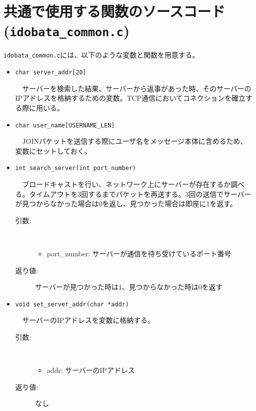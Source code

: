\documentclass[uplatex,dvipdfmx,11pt,a4paper]{jsarticle} %
\begin{document}
\section{共通で使用する関数のソースコード({\tt idobata\_common.c})}
{\tt idobata\_common.c}には、以下のような変数と関数を用意する。

\begin{itemize}
    \item {\tt char server\_addr[20]}

        　サーバーを検索した結果、サーバーから返事があった時、そのサーバーのIPアドレスを格納するための変数。TCP通信においてコネクションを確立する際に用いる。
        \newline

    \item {\tt char user\_name[USERNAME\_LEN]} 

        　JOINパケットを送信する際にユーザ名をメッセージ本体に含めるため、変数にセットしておく。
        \newline

    \item {\tt int search\_server(int port\_number)}

        　ブロードキャストを行い、ネットワーク上にサーバーが存在するか調べる。タイムアウトを3回するまでパケットを再送する。3回の送信でサーバーが見つからなかった場合は0を返し、見つかった場合は即座に1を返す。
        \begin{description}
            \item[引数:] \ 

                \begin{itemize}
                    \item port\_number: サーバーが通信を待ち受けているポート番号
                \end{itemize}
            \item[返り値:] サーバーが見つかった時は1、見つからなかった時は0を返す
            \newline
        \end{description}

    \item {\tt void set\_server\_addr(char *addr)}

        　サーバーのIPアドレスを変数に格納する。
        \begin{description}
            \item[引数:] \ 

                \begin{itemize}
                    \item addr: サーバーのIPアドレス
                \end{itemize}
            \item[返り値:] なし
            \newline
        \end{description}


\end{itemize}
\end{document}
